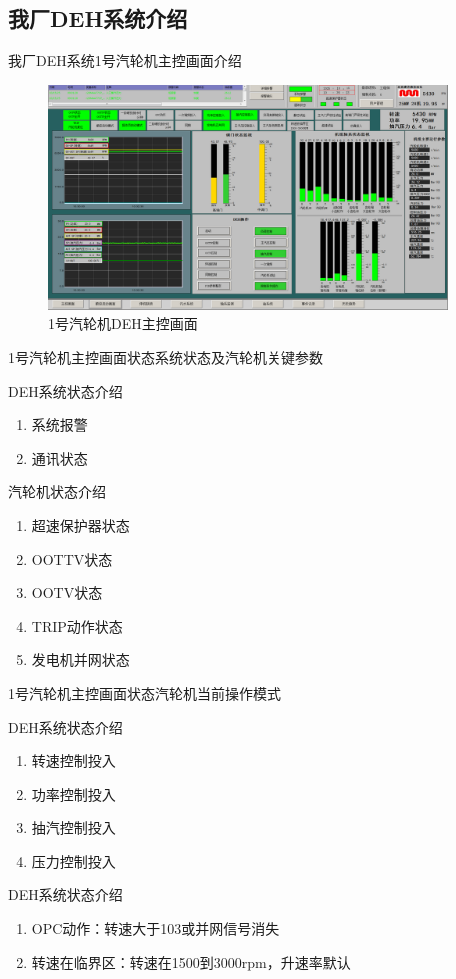 \documentclass[12pt,hyperref={CJKbookmarks=true}]{beamer} %
\begin{document}
\subsection{我厂DEH系统介绍}
\begin{frame}{我厂DEH系统}{1号汽轮机主控画面介绍}
		\begin{figure}[htbp]
 \centering
\includegraphics[width=300pt,keepaspectratio]{pic/zhu.png}
\caption{1号汽轮机DEH主控画面}
\label{fig:myphoto}
\end{figure}
	\end{frame}
\begin{frame}{1号汽轮机主控画面状态}{系统状态及汽轮机关键参数}
\begin{block}{DEH系统状态介绍}
			\begin{enumerate}
				\item 系统报警
				\item 通讯状态
			\end{enumerate}
		\end{block}
\begin{block}{汽轮机状态介绍}
			\begin{enumerate}
				\item 超速保护器状态
				\item OOTTV状态
				\item OOTV状态
				\item TRIP动作状态
				\item 发电机并网状态
			\end{enumerate}
		\end{block}
\end{frame}
\begin{frame}{1号汽轮机主控画面状态}{汽轮机当前操作模式}
\begin{block}{DEH系统状态介绍}
			\begin{enumerate}
				\item 转速控制投入
				\item 功率控制投入
				\item 抽汽控制投入
				\item 压力控制投入
			\end{enumerate}
		\end{block}
\begin{block}{DEH系统状态介绍}
			\begin{enumerate}
				\item OPC动作：转速大于103或并网信号消失
				\item 转速在临界区：转速在1500到3000rpm，升速率默认
			\end{enumerate}
		\end{block}
\end{frame}
\end{document}
